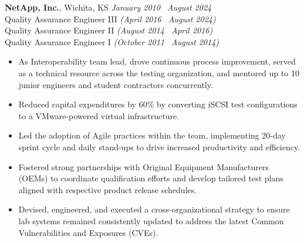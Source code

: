 \documentclass[10pt]{article}       %
\begin{document}
\textbf{NetApp, Inc.}, Wichita, KS \hfill \textit{January 2010 \textendash\ August 2024} \\
\vspace{1pt}
Quality Assurance Engineer III \textit{(April 2016 \textendash\ August 2024)} \\
Quality Assurance Engineer II \textit{(August 2014 \textendash\ April 2016)} \\
Quality Assurance Engineer I \textit{(October 2011 \textendash\ August 2014)} \\
\begin{itemize}
  \item As Interoperability team lead, drove continuous process improvement, served as a technical resource across the testing organization, and mentored up to 10 junior engineers and student contractors concurrently.
  \item Reduced capital expenditures by 60\% by converting iSCSI test configurations to a VMware-powered virtual infrastructure.
  \item Led the adoption of Agile practices within the team, implementing 20-day sprint cycle and daily stand-ups to drive increased productivity and efficiency.
  \item Fostered strong partnerships with Original Equipment Manufacturers (OEMs) to coordinate qualification efforts and develop tailored test plans aligned with respective product release schedules.
  \item Devised, engineered, and executed a cross-organizational strategy to ensure lab systems remained consistently updated to address the latest Common Vulnerabilities and Exposures (CVEs).

\end{itemize}
\end{document}
